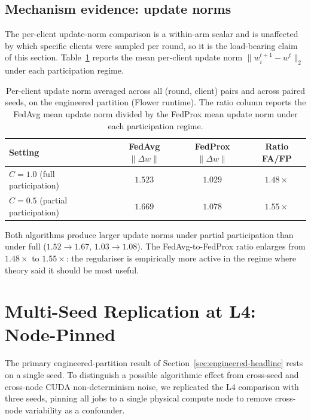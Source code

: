 \documentclass[11pt,a4paper]{report}
\begin{document}
\subsection{Mechanism evidence: update norms}
\label{sec:sh-partial-update-norms}

The per-client update-norm comparison is a within-arm scalar and
is unaffected by which specific clients were sampled per round, so
it is the load-bearing claim of this section.
Table~\ref{tab:sh-partial-norms} reports the mean per-client
update norm $\lVert w_i^{t+1} - w^t \rVert_2$ under each
participation regime.

\begin{table}[!htbp]
\centering
\caption{Per-client update norm averaged across all (round,
client) pairs and across paired seeds, on the engineered
partition (Flower runtime). The ratio column reports the FedAvg
mean update norm divided by the FedProx mean update norm under
each participation regime.}
\label{tab:sh-partial-norms}
\small
\begin{tabular}{lccc}
\toprule
Setting & FedAvg $\lVert \Delta w \rVert$ & FedProx $\lVert \Delta w \rVert$ & Ratio FA/FP \\
\midrule
$C = 1.0$ (full participation)    & $1.523$ & $\mathbf{1.029}$ & $1.48\times$ \\
$C = 0.5$ (partial participation) & $1.669$ & $\mathbf{1.078}$ & $\mathbf{1.55\times}$ \\
\bottomrule
\end{tabular}
\end{table}

Both algorithms produce larger update norms under partial
participation than under full ($1.52 \to 1.67$, $1.03 \to 1.08$).
The FedAvg-to-FedProx ratio enlarges from $1.48\times$ to
$1.55\times$: the regulariser is empirically more active in the
regime where theory said it should be most useful.



\section{Multi-Seed Replication at L4: Node-Pinned}
\label{sec:node-pinned-l4}

The primary engineered-partition result of
Section~\ref{sec:engineered-headline} rests on a single seed.
To distinguish a possible algorithmic effect from cross-seed and
cross-node CUDA non-determinism noise, we replicated the L4
comparison with three seeds, pinning all jobs to a single physical
compute node to remove cross-node variability as a confounder.
\end{document}
